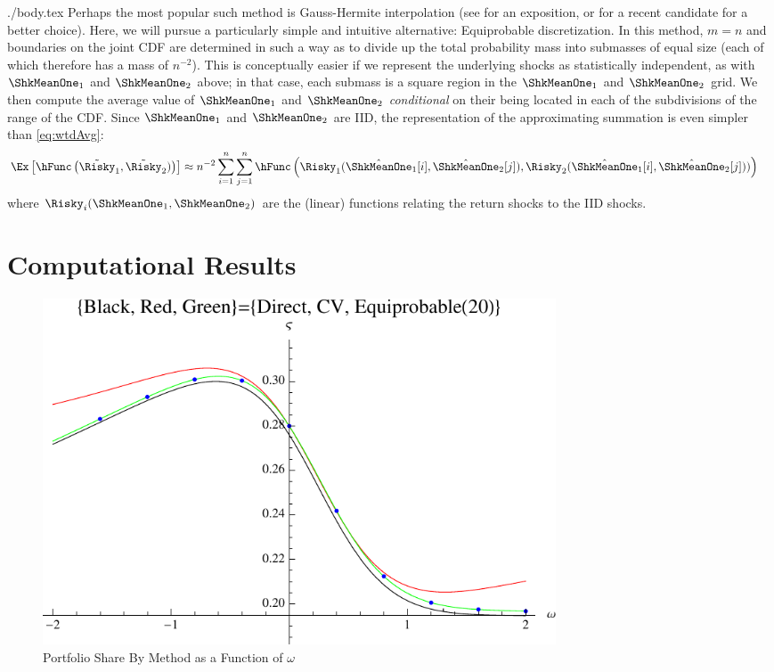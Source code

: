 \documentclass{handout}
\begin{document}
\begin{verbatimwrite}{./body.tex}
Perhaps the most popular such method is Gauss-Hermite interpolation
(see \cite{judd:book} for an exposition, or \cite{kopecky2010finite}
for a recent candidate for a better choice).  Here, we will pursue a
particularly simple and intuitive alternative: Equiprobable discretization.  In
this method, $m=n$ and boundaries on the joint CDF are determined in
such a way as to divide up the total probability mass into submasses
of equal size (each of which therefore has a mass of $n^{-2}$).  This
is conceptually easier if we represent the underlying shocks as
statistically independent, as with $\ShkMeanOne_{1}$ and
$\ShkMeanOne_{2}$ above; in that case, each submass is a square region
in the $\ShkMeanOne_{1}$ and $\ShkMeanOne_{2}$ grid.  We then compute
the average value of $\ShkMeanOne_{1}$ and $\ShkMeanOne_{2}$ {\it
  conditional} on their being located in each of the subdivisions of
the range of the CDF.  Since $\ShkMeanOne_{1}$ and $\ShkMeanOne_{2}$
are IID, the representation of the approximating summation is even
simpler than \eqref{eq:wtdAvg}:
\begin{equation*}\begin{gathered}\begin{aligned}
  \Ex\left[\hFunc\left(\tilde{\Risky}_{1},\tilde{\Risky}_{2})\right)\right] & \approx  n^{-2} \sum_{i=1}^{n}\sum_{j=1}^{n} \hFunc\left(\Risky_{1}(\hat{\ShkMeanOne}_{1}[i],\hat{\ShkMeanOne}_{2}[j]),\Risky_{2}(\hat{\ShkMeanOne}_{1}[i],\hat{\ShkMeanOne}_{2}[j]))\right) \label{eq:wtdAvgMod}
\end{aligned}\end{gathered}\end{equation*}
where $\Risky_{i}(\ShkMeanOne_{1},\ShkMeanOne_{2})$ are the (linear) functions relating the return shocks to the IID shocks.


\section{Computational Results}
\begin{figure}
\includegraphics[width=6in]{../Figures/ShareVsCovByMethod}
\caption{Portfolio Share By Method as a Function of $\omega$}\label{fig:ShareVsCovByMethod}
\end{figure}


\end{verbatimwrite}
\end{document}
